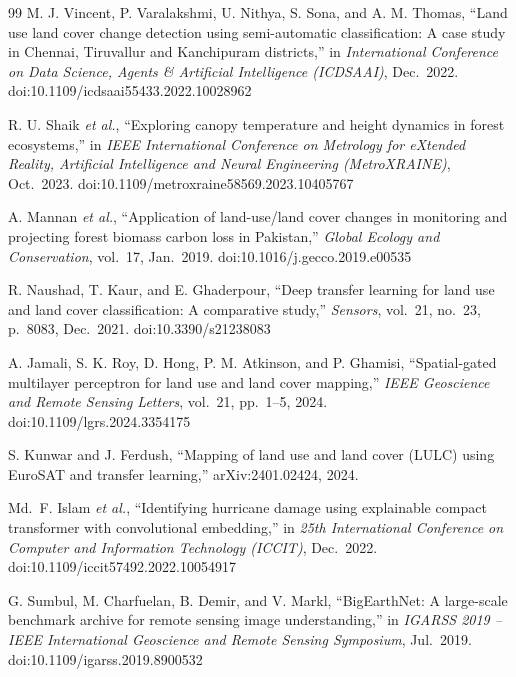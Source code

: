 \documentclass[11pt]{article}
\begin{document}
\begin{thebibliography}{99}
 M. J. Vincent, P. Varalakshmi, U. Nithya, S. Sona, and A. M. Thomas, ``Land use land
cover change detection using semi-automatic classification: A case study in Chennai, Tiruvallur and
Kanchipuram districts,'' in \emph{International Conference on Data Science, Agents \& Artificial
Intelligence (ICDSAAI)}, Dec.~2022. doi:10.1109/icdsaai55433.2022.10028962

 R. U. Shaik \emph{et al.}, ``Exploring canopy temperature and height dynamics in forest
ecosystems,'' in \emph{IEEE International Conference on Metrology for eXtended Reality, Artificial
Intelligence and Neural Engineering (MetroXRAINE)}, Oct.~2023. doi:10.1109/metroxraine58569.2023.10405767

 A. Mannan \emph{et al.}, ``Application of land-use/land cover changes in monitoring and
projecting forest biomass carbon loss in Pakistan,'' \emph{Global Ecology and Conservation}, vol.~17,
Jan.~2019. doi:10.1016/j.gecco.2019.e00535

 R. Naushad, T. Kaur, and E. Ghaderpour, ``Deep transfer learning for land use and land
cover classification: A comparative study,'' \emph{Sensors}, vol.~21, no.~23, p.~8083, Dec.~2021.
doi:10.3390/s21238083

 A. Jamali, S. K. Roy, D. Hong, P. M. Atkinson, and P. Ghamisi, ``Spatial-gated multilayer
perceptron for land use and land cover mapping,'' \emph{IEEE Geoscience and Remote Sensing Letters},
vol.~21, pp.~1--5, 2024. doi:10.1109/lgrs.2024.3354175

 S. Kunwar and J. Ferdush, ``Mapping of land use and land cover (LULC) using EuroSAT and
transfer learning,'' arXiv:2401.02424, 2024.

 Md.~F. Islam \emph{et al.}, ``Identifying hurricane damage using explainable compact
transformer with convolutional embedding,'' in \emph{25th International Conference on Computer and
Information Technology (ICCIT)}, Dec.~2022. doi:10.1109/iccit57492.2022.10054917

 G. Sumbul, M. Charfuelan, B. Demir, and V. Markl, ``BigEarthNet: A large-scale benchmark
archive for remote sensing image understanding,'' in \emph{IGARSS 2019 -- IEEE International Geoscience
and Remote Sensing Symposium}, Jul.~2019. doi:10.1109/igarss.2019.8900532

\end{thebibliography}
\end{document}
